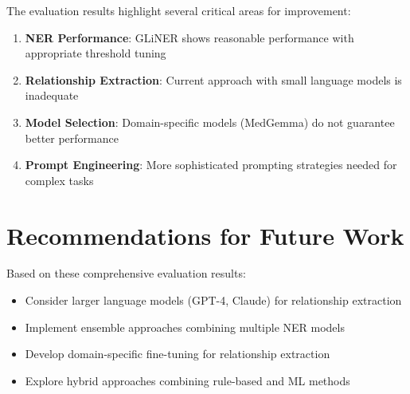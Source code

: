 The evaluation results highlight several critical areas for improvement:

\begin{enumerate}
    \item \textbf{NER Performance}: GLiNER shows reasonable performance with appropriate threshold tuning
    \item \textbf{Relationship Extraction}: Current approach with small language models is inadequate
    \item \textbf{Model Selection}: Domain-specific models (MedGemma) do not guarantee better performance
    \item \textbf{Prompt Engineering}: More sophisticated prompting strategies needed for complex tasks
\end{enumerate}

\section{Recommendations for Future Work}

Based on these comprehensive evaluation results:
\begin{itemize}
    \item Consider larger language models (GPT-4, Claude) for relationship extraction
    \item Implement ensemble approaches combining multiple NER models
    \item Develop domain-specific fine-tuning for relationship extraction
    \item Explore hybrid approaches combining rule-based and ML methods
\end{itemize}
